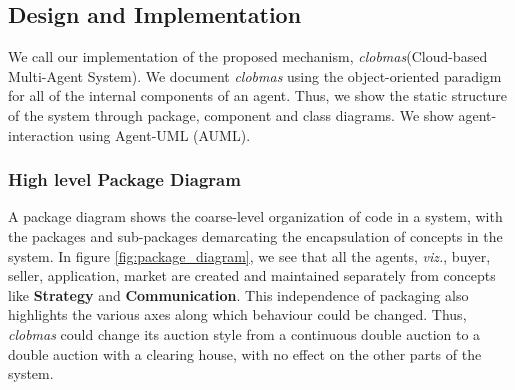 \documentclass[10pt,journal,compsoc]{IEEEtran}
\begin{document}
%
% 


\subsection{Design and Implementation}
We call our implementation of the proposed mechanism, \textit{clobmas}(Cloud-based Multi-Agent System). We document \textit{clobmas} using the object-oriented paradigm for all of the internal components of an agent. Thus, we show the static structure of the system through package, component and class diagrams. We show agent-interaction using Agent-UML (AUML).	
\subsubsection{High level Package Diagram} A package diagram shows the coarse-level organization of code in a system, with the packages and sub-packages demarcating the encapsulation of concepts in the system. In figure \ref{fig:package_diagram}, we see that all the agents, \textit{viz.}, buyer, seller, application, market are created and maintained separately from concepts like \textbf{Strategy} and \textbf{Communication}. This independence of packaging also highlights the various axes along which behaviour could be changed. Thus, \textit{clobmas} could change its auction style from a continuous double auction to a double auction with a clearing house, with no effect on the other parts of the system. 
\end{document}
